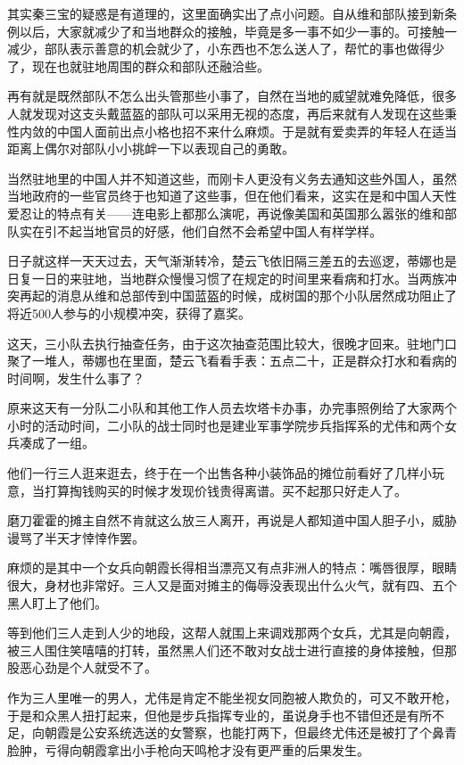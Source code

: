 其实秦三宝的疑惑是有道理的，这里面确实出了点小问题。自从维和部队接到新条例以后，大家就减少了和当地群众的接触，毕竟是多一事不如少一事的。可接触一减少，部队表示善意的机会就少了，小东西也不怎么送人了，帮忙的事也做得少了，现在也就驻地周围的群众和部队还融洽些。

再有就是既然部队不怎么出头管那些小事了，自然在当地的威望就难免降低，很多人就发现对这支头戴蓝盔的部队可以采用无视的态度，再后来就有人发现在这些秉性内敛的中国人面前出点小格也招不来什么麻烦。于是就有爱卖弄的年轻人在适当距离上偶尔对部队小小挑衅一下以表现自己的勇敢。

当然驻地里的中国人并不知道这些，而刚卡人更没有义务去通知这些外国人，虽然当地政府的一些官员终于也知道了这些事，但在他们看来，这实在是和中国人天性爱忍让的特点有关——连电影上都那么演呢，再说像美国和英国那么嚣张的维和部队实在引不起当地官员的好感，他们自然不会希望中国人有样学样。

日子就这样一天天过去，天气渐渐转冷，楚云飞依旧隔三差五的去巡逻，蒂娜也是日复一日的来驻地，当地群众慢慢习惯了在规定的时间里来看病和打水。当两族冲突再起的消息从维和总部传到中国蓝盔的时候，成树国的那个小队居然成功阻止了将近500人参与的小规模冲突，获得了嘉奖。

这天，三小队去执行抽查任务，由于这次抽查范围比较大，很晚才回来。驻地门口聚了一堆人，蒂娜也在里面，楚云飞看看手表：五点二十，正是群众打水和看病的时间啊，发生什么事了？

原来这天有一分队二小队和其他工作人员去坎塔卡办事，办完事照例给了大家两个小时的活动时间，二小队的战士同时也是建业军事学院步兵指挥系的尤伟和两个女兵凑成了一组。

他们一行三人逛来逛去，终于在一个出售各种小装饰品的摊位前看好了几样小玩意，当打算掏钱购买的时候才发现价钱贵得离谱。买不起那只好走人了。

磨刀霍霍的摊主自然不肯就这么放三人离开，再说是人都知道中国人胆子小，威胁谩骂了半天才悻悻作罢。

麻烦的是其中一个女兵向朝霞长得相当漂亮又有点非洲人的特点：嘴唇很厚，眼睛很大，身材也非常好。三人又是面对摊主的侮辱没表现出什么火气，就有四、五个黑人盯上了他们。

等到他们三人走到人少的地段，这帮人就围上来调戏那两个女兵，尤其是向朝霞，被三人围住笑嘻嘻的打转，虽然黑人们还不敢对女战士进行直接的身体接触，但那股恶心劲是个人就受不了。

作为三人里唯一的男人，尤伟是肯定不能坐视女同胞被人欺负的，可又不敢开枪，于是和众黑人扭打起来，但他是步兵指挥专业的，虽说身手也不错但还是有所不足，向朝霞是公安系统选送的女警察，也能打两下，但最终尤伟还是被打了个鼻青脸肿，亏得向朝霞拿出小手枪向天鸣枪才没有更严重的后果发生。

